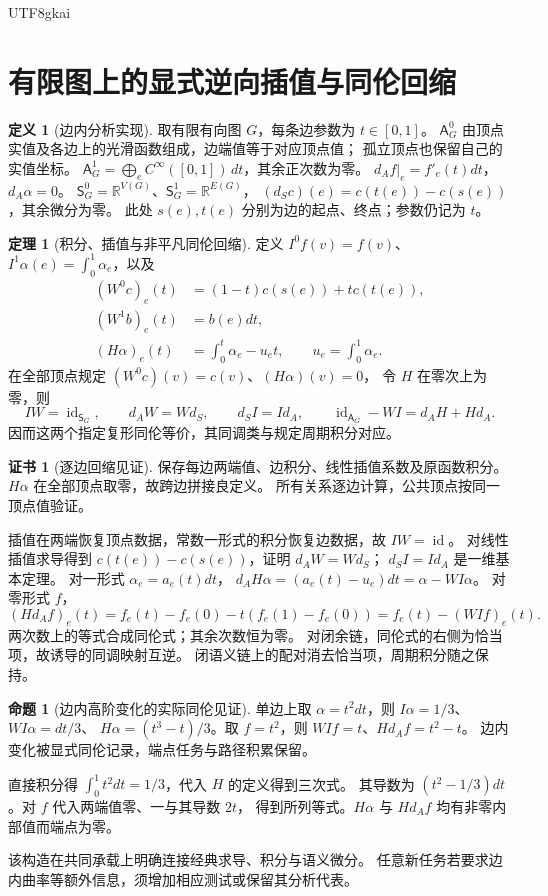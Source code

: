 \documentclass[12pt]{report}
\makeatletter
\theoremstyle{definition}
\newtheorem{definition}{定义}[chapter]
\newtheorem{theorem}{定理}[chapter]
\newtheorem{proposition}{命题}[chapter]
\newtheorem{Certificate}{证书}[chapter]
\renewenvironment{proof}[1][\proofname]{\par
  \pushQED{\qed}\normalfont
  \topsep6\p@\@plus6\p@\relax
  \trivlist
  \item[\hskip\labelsep\normalfont #1\@addpunct{.}]\ignorespaces
}{
  \popQED\endtrivlist\@endpefalse
}
\newcommand{\RR}{\mathbb R}
\newcommand{\id}{\operatorname{id}}
\makeatother
\begin{document}
\begin{CJK*}{UTF8}{gkai}
\section{有限图上的显式逆向插值与同伦回缩}
\begin{definition}[边内分析实现]
\label{def:edge-analytic-model}
取有限有向图 \(G\)，每条边参数为 \(t\in[0,1]\)。
\(\mathsf A_G^0\) 由顶点实值及各边上的光滑函数组成，边端值等于对应顶点值；
孤立顶点也保留自己的实值坐标。
\(\mathsf A_G^1=\bigoplus_e C^\infty([0,1])\,dt\)，其余正次数为零。
\(d_Af|_e=f'_e(t)dt\)，\(d_A\alpha=0\)。
\(\mathsf S_G^0=\RR^{V(G)}\)、\(\mathsf S_G^1=\RR^{E(G)}\)，
\((d_Sc)(e)=c(t(e))-c(s(e))\)，其余微分为零。
此处 \(s(e),t(e)\) 分别为边的起点、终点；参数仍记为 \(t\)。
\end{definition}
\begin{theorem}[积分、插值与非平凡同伦回缩]
\label{thm:edge-deformation}
定义 \(I^0f(v)=f(v)\)、\(I^1\alpha(e)=\int_0^1\alpha_e\)，以及
\[
\begin{aligned}
(W^0c)_e(t)&=(1-t)c(s(e))+tc(t(e)),\\
(W^1b)_e(t)&=b(e)dt,\\
(H\alpha)_e(t)&=\int_0^t\alpha_e-u_e t,
\qquad u_e=\int_0^1\alpha_e.
\end{aligned}
\]
在全部顶点规定 \((W^0c)(v)=c(v)\)、\((H\alpha)(v)=0\)，
令 \(H\) 在零次上为零，则
\[
IW=\id_{\mathsf S_G},\qquad
d_AW=Wd_S,\qquad d_SI=Id_A,\qquad
\id_{\mathsf A_G}-WI=d_AH+Hd_A.
\]
因而这两个指定复形同伦等价，其同调类与规定周期积分对应。
\end{theorem}
\begin{Certificate}[逐边回缩见证]
保存每边两端值、边积分、线性插值系数及原函数积分。
\(H\alpha\) 在全部顶点取零，故跨边拼接良定义。
所有关系逐边计算，公共顶点按同一顶点值验证。
\end{Certificate}
\begin{proof}
插值在两端恢复顶点数据，常数一形式的积分恢复边数据，故 \(IW=\id\)。
对线性插值求导得到 \(c(t(e))-c(s(e))\)，证明 \(d_AW=Wd_S\)；
\(d_SI=Id_A\) 是一维基本定理。
对一形式 \(\alpha_e=a_e(t)dt\)，
\(d_AH\alpha=(a_e(t)-u_e)dt=\alpha-WI\alpha\)。
对零形式 \(f\)，
\[
(Hd_Af)_e(t)=f_e(t)-f_e(0)-t(f_e(1)-f_e(0))=f_e(t)-(WI f)_e(t).
\]
两次数上的等式合成同伦式；其余次数恒为零。
对闭余链，同伦式的右侧为恰当项，故诱导的同调映射互逆。
闭语义链上的配对消去恰当项，周期积分随之保持。
\end{proof}
\begin{proposition}[边内高阶变化的实际同伦见证]
\label{prop:edge-witness}
单边上取 \(\alpha=t^2dt\)，则
\(I\alpha=1/3\)、\(WI\alpha=dt/3\)、
\(H\alpha=(t^3-t)/3\)。取 \(f=t^2\)，则
\(WIf=t\)、\(Hd_Af=t^2-t\)。
边内变化被显式同伦记录，端点任务与路径积累保留。
\end{proposition}
\begin{proof}
直接积分得 \(\int_0^1t^2dt=1/3\)，代入 \(H\) 的定义得到三次式。
其导数为 \((t^2-1/3)dt\)。对 \(f\) 代入两端值零、一与其导数 \(2t\)，
得到所列等式。\(H\alpha\) 与 \(Hd_Af\) 均有非零内部值而端点为零。
\end{proof}
该构造在共同承载上明确连接经典求导、积分与语义微分。
任意新任务若要求边内曲率等额外信息，须增加相应测试或保留其分析代表。


\end{CJK*}
\end{document}
